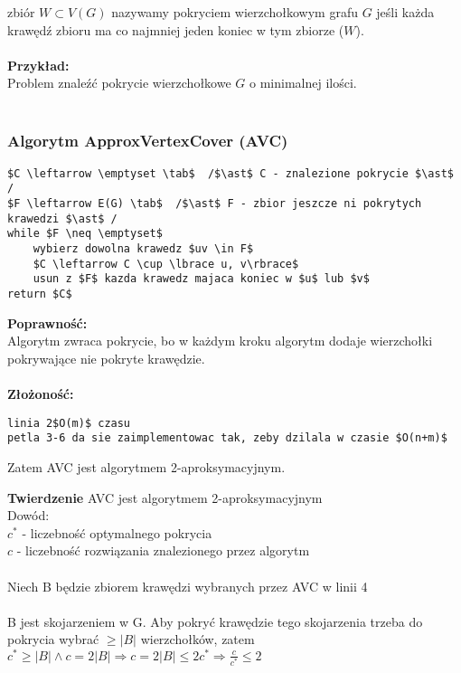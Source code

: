 zbiór $W\subset V(G)$ nazywamy pokryciem wierzchołkowym grafu $G$ jeśli każda krawędź zbioru ma co najmniej jeden koniec w tym zbiorze ($W$).\\
\\
\textbf{Przykład: }\\
Problem znaleźć pokrycie wierzchołkowe $G$ o minimalnej ilości.\\
\\
\subsubsection{Algorytm ApproxVertexCover (AVC)}
\begin{lstlisting}[caption={AVC(G)}]
$C \leftarrow \emptyset \tab$  /$\ast$ C - znalezione pokrycie $\ast$ /
$F \leftarrow E(G) \tab$  /$\ast$ F - zbior jeszcze ni pokrytych krawedzi $\ast$ /
while $F \neq \emptyset$
	wybierz dowolna krawedz $uv \in F$
	$C \leftarrow C \cup \lbrace u, v\rbrace$
	usun z $F$ kazda krawedz majaca koniec w $u$ lub $v$
return $C$
\end{lstlisting}
\textbf{Poprawność: }\\
\tab Algorytm zwraca pokrycie, bo w każdym kroku algorytm dodaje wierzchołki pokrywające nie pokryte krawędzie.\\
\\
\textbf{Złożoność: }\\
\begin{lstlisting}
linia 2$O(m)$ czasu
petla 3-6 da sie zaimplementowac tak, zeby dzilala w czasie $O(n+m)$
\end{lstlisting}
\begin{center}
Zatem AVC jest algorytmem 2-aproksymacyjnym.
\end{center}
\textbf{Twierdzenie }AVC jest algorytmem 2-aproksymacyjnym\\
Dowód:\\
\tab $c^{\ast}$ - liczebność optymalnego pokrycia\\
\tab $c$ - liczebność rozwiązania znalezionego przez algorytm\\
\\
Niech B będzie zbiorem krawędzi wybranych przez AVC w linii 4\\
\\
B jest skojarzeniem w G. Aby pokryć krawędzie tego skojarzenia trzeba do pokrycia wybrać $\geq \vert B\vert$ wierzchołków, zatem $c^{\ast} \geq \vert B\vert \wedge c = 2\vert B\vert \Rightarrow c = 2\vert B\vert \leq 2c^{\ast} \Rightarrow \frac{c}{c^{\ast}} \leq 2$
